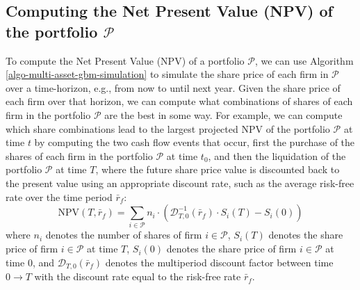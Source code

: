 \documentclass[11pt]{article}
\theoremstyle{definition}
\begin{document}
\subsection*{Computing the Net Present Value (NPV) of the portfolio $\mathcal{P}$}
To compute the Net Present Value (NPV) of a portfolio $\mathcal{P}$, we can use Algorithm \ref{algo-multi-asset-gbm-simulation} 
to simulate the share price of each firm in $\mathcal{P}$ over a time-horizon, e.g., from now to until next year.
Given the share price of each firm over that horizon, we can compute what combinations of shares of each firm in the portfolio $\mathcal{P}$ are the best in some way. For example, we can compute which share combinations lead to the largest projected NPV of the portfolio $\mathcal{P}$ at time $t$ by computing the 
two cash flow events that occur, first the purchase of the shares of each firm in the portfolio $\mathcal{P}$ at time $t_{0}$, and then the liquidation of the portfolio $\mathcal{P}$ at time $T$, where the future share price value is discounted back to the present value using an appropriate discount rate, such as the average risk-free rate over the time period $\bar{r}_{f}$:
\begin{equation}\label{eqn:npv-mv-gbm}
\text{NPV}(T,\bar{r}_{f}) = \sum_{i\in\mathcal{P}}n_{i}\cdot\left(\mathcal{D}_{T,0}^{-1}(\bar{r}_{f})\cdot{S_{i}(T)}-S_{i}(0)\right)
\end{equation}
where $n_{i}$ denotes the number of shares of firm $i\in\mathcal{P}$, $S_{i}(T)$ denotes the share price of firm $i\in\mathcal{P}$ at time $T$, $S_{i}(0)$ denotes the share price of firm $i\in\mathcal{P}$ at time $0$, and $\mathcal{D}_{T,0}(\bar{r}_{f})$ denotes the multiperiod discount factor between time $0\rightarrow{T}$ with the discount rate equal to the risk-free rate $\bar{r}_{f}$.
\end{document}
